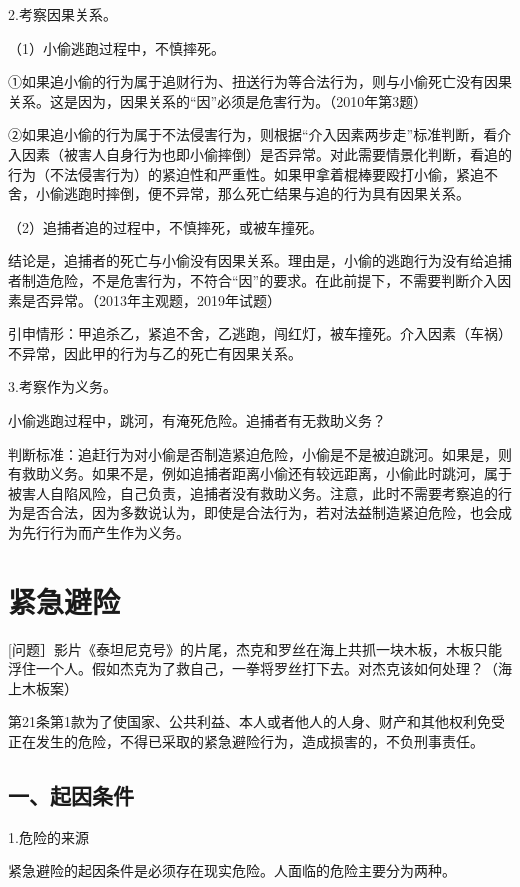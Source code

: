 2.考察因果关系。

（1）小偷逃跑过程中，不慎摔死。

①如果追小偷的行为属于追财行为、扭送行为等合法行为，则与小偷死亡没有因果关系。这是因为，因果关系的“因”必须是危害行为。（2010年第3题）

②如果追小偷的行为属于不法侵害行为，则根据“介入因素两步走”标准判断，看介入因素（被害人自身行为也即小偷摔倒）是否异常。对此需要情景化判断，看追的行为（不法侵害行为）的紧迫性和严重性。如果甲拿着棍棒要殴打小偷，紧追不舍，小偷逃跑时摔倒，便不异常，那么死亡结果与追的行为具有因果关系。

（2）追捕者追的过程中，不慎摔死，或被车撞死。

结论是，追捕者的死亡与小偷没有因果关系。理由是，小偷的逃跑行为没有给追捕者制造危险，不是危害行为，不符合“因”的要求。在此前提下，不需要判断介入因素是否异常。（2013年主观题，2019年试题）

引申情形：甲追杀乙，紧追不舍，乙逃跑，闯红灯，被车撞死。介入因素（车祸）不异常，因此甲的行为与乙的死亡有因果关系。

3.考察作为义务。

小偷逃跑过程中，跳河，有淹死危险。追捕者有无救助义务？

判断标准：追赶行为对小偷是否制造紧迫危险，小偷是不是被迫跳河。如果是，则有救助义务。如果不是，例如追捕者距离小偷还有较远距离，小偷此时跳河，属于被害人自陷风险，自己负责，追捕者没有救助义务。注意，此时不需要考察追的行为是否合法，因为多数说认为，即使是合法行为，若对法益制造紧迫危险，也会成为先行行为而产生作为义务。

\section{紧急避险}

[问题］影片《泰坦尼克号》的片尾，杰克和罗丝在海上共抓一块木板，木板只能浮住一个人。假如杰克为了救自己，一拳将罗丝打下去。对杰克该如何处理？（海上木板案）

第21条第1款为了使国家、公共利益、本人或者他人的人身、财产和其他权利免受正在发生的危险，不得已采取的紧急避险行为，造成损害的，不负刑事责任。

\subsection*{一、起因条件}

1.危险的来源

紧急避险的起因条件是必须存在现实危险。人面临的危险主要分为两种。

